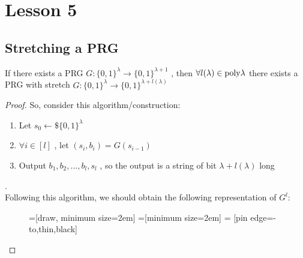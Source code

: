 \chapter*{Lesson 5}

\section{Stretching a PRG}
\begin{theorem}
    If there exists a PRG $G:\{0,1\}^{\lambda} \to \{0,1\}^{\lambda + 1}$ ,
    then $ \forall l(\lambda) \in \mathrm{poly}{\lambda} $
    there exists a PRG with stretch $G:\{0,1\}^{\lambda} \to \{0,1\}^{\lambda +
    l(\lambda)} $ 
\end{theorem}

\begin{proof}
    So, consider this algorithm/construction:\\
    \begin{enumerate}
        \item Let $s_{0} \leftarrow\$ \{ 0,1\}^{\lambda}$
        \item $ \forall i \in [l] $ , let $(s_{i}, b_{i}) = G(s_{i-1})$
        \item Output $b_{1}, b_{2}, ..., b_{l}, s_{l}$ , so the output is a
            string of bit $\lambda + l(\lambda)$ long
    \end{enumerate}.\\
    Following this algorithm, we should obtain the following representation of
    $G^{l}$:
    \begin{figure}[h!]
        
=[draw, minimum size=2em]
=[minimum size=2em]
 = [pin edge={-to,thin,black}]

\end{figure}
\end{proof}
